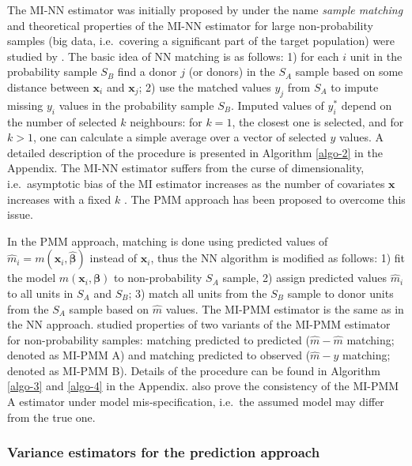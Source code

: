 \documentclass[
]{jss}
\begin{document}
The MI-NN estimator was initially proposed by \citet{rivers2007sampling}
under the name \textit{sample matching} and theoretical properties of
the MI-NN estimator for large non-probability samples (big data,
i.e.~covering a significant part of the target population) were studied
by \citet{yang2021integration}. The basic idea of NN matching is as
follows: 1) for each \(i\) unit in the probability sample \(S_B\) find a
donor \(j\) (or donors) in the \(S_A\) sample based on some distance
between \(\boldsymbol{x}_i\) and \(\boldsymbol{x}_j\); 2) use the
matched values \(y_j\) from \(S_A\) to impute missing \(y_i\) values in
the probability sample \(S_B\). Imputed values of \(y_i^*\) depend on
the number of selected \(k\) neighbours: for \(k=1\), the closest one is
selected, and for \(k>1\), one can calculate a simple average over a
vector of selected \(y\) values. A detailed description of the procedure
is presented in Algorithm \ref{algo-2} in the Appendix. The MI-NN
estimator suffers from the curse of dimensionality, i.e.~asymptotic bias
of the MI estimator increases as the number of covariates
\(\boldsymbol{x}\) increases with a fixed \(k\)
\citep{abadie2006large, yang_asymptotic_2020}. The PMM approach has been
proposed to overcome this issue.

In the PMM approach, matching is done using predicted values of
\(\hat{m}_i=m\left(\boldsymbol{x}_i, \hat{\boldsymbol{\beta}}\right)\)
instead of \(\boldsymbol{x}_i\), thus the NN algorithm is modified as
follows: 1) fit the model
\(m\left(\boldsymbol{x}_i, \boldsymbol{\beta}\right)\) to
non-probability \(S_A\) sample, 2) assign predicted values \(\hat{m}_i\)
to all units in \(S_A\) and \(S_B\); 3) match all units from the \(S_B\)
sample to donor units from the \(S_A\) sample based on \(\hat{m}\)
values. The MI-PMM estimator is the same as in the NN approach.
\citet{chlebicki2025} studied properties of two variants of the MI-PMM
estimator for non-probability samples: matching predicted to predicted
(\(\hat{m}-\hat{m}\) matching; denoted as MI-PMM A) and matching
predicted to observed (\(\hat{m}-y\) matching; denoted as MI-PMM B).
Details of the procedure can be found in Algorithm \ref{algo-3} and
\ref{algo-4} in the Appendix. \citet{chlebicki2025} also prove the
consistency of the MI-PMM A estimator under model mis-specification,
i.e.~the assumed model may differ from the true one.

\subsubsection{Variance estimators for the prediction
approach}\label{variance-estimators-for-the-prediction-approach}
\end{document}
